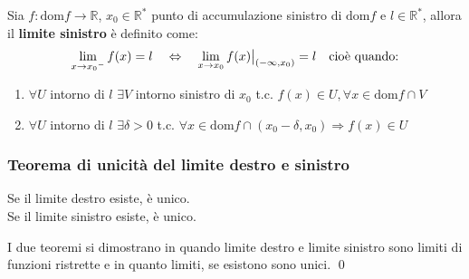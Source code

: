 \documentclass[a4paper]{article}
\newcommand\restr[2]{{%
	\left.\kern-\nulldelimiterspace %
	#1 %
	\vphantom{\big|} %
	\right|_{#2} %
	}}
\newcommand\dom{\text{dom}}
\begin{document}
Sia \(f: \dom f \to \mathbb{R}\), \(x_0 \in \mathbb{R}^*\) punto di accumulazione sinistro di \(\dom f\) e \(l \in \mathbb{R}^*\), allora il \textbf{limite sinistro} è definito come:
\[\lim_{x \to {x_0}^-} f(x) = l \quad \Leftrightarrow \quad \lim_{x \to {x_0}} \restr{f(x)}{\left( - \infty, x_0 \right)} = l \quad \text{cioè quando:}\]
\begin{enumerate}
	\item \(\forall U\) intorno di \(l\) \(\exists V\) intorno sinistro di \(x_0\) t.c. \(f(x) \in U, \forall x \in \dom f \cap V\)
	\item \(\forall U\) intorno di \(l\) \(\exists \delta > 0\) t.c. \(\forall x \in \dom f \cap \left( x_0 - \delta, x_0 \right) \Rightarrow f(x) \in U\)
\end{enumerate}

\subsubsection*{Teorema di unicità del limite destro e sinistro}
Se il limite destro esiste, è unico. \\
Se il limite sinistro esiste, è unico. 

I due teoremi si dimostrano in quando limite destro e limite sinistro sono limiti di funzioni ristrette e in quanto limiti, se esistono sono unici. \qed
\end{document}
